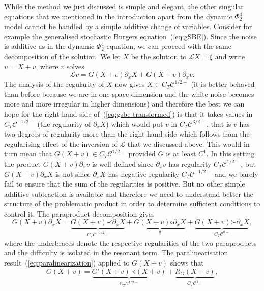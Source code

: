 \documentclass[a4paper, 11pt]{article}
\newcommand{\para}{\mathord{\prec}}
\newcommand{\lpara}{\mathord{\succ}}
\newcommand{\reso}{\mathord{\circ}}
\begin{document}
While the method we just discussed is simple and elegant, the other singular
equations that we mentioned in the introduction apart from the dynamic
$\Phi^4_2$ model cannot be handled by a simple additive change of variables.
Consider for example the generalised stochastic Burgers
equation~(\ref{eq:gSBE}). Since the noise is additive as in the dynamic
$\Phi^4_2$ equation, we can proceed with the same decomposition of the
solution. We let $X$ be the solution to $\mathcal{L}X = \xi$ and write $u = X
+ v$, where $v$ solves
\begin{equation}
  \mathcal{L}v = G (X + v) \partial_x X + G (X + v) \partial_x v.
  \label{eq:gsbe-transformed}
\end{equation}
The analysis of the regularity of $X$ now gives $X \in C_T \mathcal{C}^{1 / 2
-}$ (it is better behaved than before because we are in one space-dimension
and the white noise becomes more and more irregular in higher dimensions) and
therefore the best we can hope for the right hand side
of~(\ref{eq:gsbe-transformed}) is that it takes values in $C_T \mathcal{C}^{-
1 / 2 -}$ (the regularity of $\partial_x X$) which would put $v$ in $C_T
\mathcal{C}^{3 / 2 -}$, that is $v$ has two degrees of regularity more than
the right hand side which follows from the regularising effect of the
inversion of $\mathcal{L}$ that we discussed above. This would in turn mean
that $G (X + v) \in C_T \mathcal{C}^{1 / 2 -}$ provided $G$ is at least $C^1$.
In this setting the product $G (X + v) \partial_x v$ is well defined since
$\partial_x v$ has regularity $C_T \mathcal{C}^{1 / 2 -}$, but $G (X + v)
\partial_x X$ is not since $\partial_x X$ has negative regularity $C_T
\mathcal{C}^{- 1 / 2 -}$ and we barely fail to ensure that the sum of the
regularities is positive. But no other simple additive subtraction is
available and therefore we need to understand better the structure of the
problematic product in order to determine sufficient conditions to control it.
The paraproduct decomposition gives \
\[ G (X + v) \partial_x X = \underbrace{G (X + v) \para \partial_x X}_{C_T
   \mathcal{C}^{- 1 / 2 -}} + \underbrace{G (X + v) \reso \partial_x X}_{!!} +
   \underbrace{G (X + v) \lpara \partial_x X}_{C_T \mathcal{C}^{0 -}}, \]
where the underbraces denote the respective regularities of the two
paraproducts and the difficulty is isolated in the resonant term. The
paralinearisation result~(\ref{eq:paralinearization}) applied to $G (X + v)$
shows that
\[ G (X + v) = \underbrace{G' (X + v) \para (X + v)}_{C_T \mathcal{C}^{1 / 2
   -}} + \underbrace{R_G (X + v)}_{C_T \mathcal{C}^{1 -}}, \]
\end{document}
